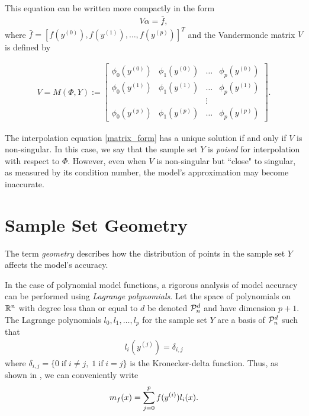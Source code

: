 This equation can be written more compactly in the form
\begin{align}
\label{matrix_form}
V \alpha = \bar{f},
\end{align}
where $\bar{f} = [f(y^{(0)}), f(y^{(1)}), \ldots, f(y^{(p)})]^T$ and the Vandermonde matrix $V$ is defined by 

\begin{align}
\label{vandermonde}
V=M(\Phi,Y) :=
\begin{bmatrix}
    \phi_0(y^{(0)})      & \phi_1(y^{(0)})       & \ldots & \phi_{p}(y^{(0)})      \\
    \phi_0(y^{(1)})      & \phi_1(y^{(1)})       & \dots  & \phi_{p}(y^{(1)})      \\
                     &                   & \vdots &                    \\
    \phi_0(y^{(p)})    & \phi_1(y^{(p)})     & \ldots & \phi_{p}(y^{{(p)}})
\end{bmatrix}.
\end{align}


The interpolation equation \cref{matrix_form} has a unique solution if and only if $V$ is non-singular.
In this case, we say that the sample set $Y$ is \emph{poised} for interpolation with respect to $\Phi$. 
However, even when $V$ is non-singular but ``close" to singular, as measured by its condition number, 
the model's approximation may become inaccurate.


\section{Sample Set Geometry}

\label{geometry}
The term \emph{geometry} describes how the distribution of points in the sample set $Y$ affects the model's accuracy.

In the case of polynomial model functions, a rigorous analysis of model accuracy can be performed using \emph{Lagrange polynomials}.
Let the space of polynomials on $\mathbb R^n$ with degree less than or equal to $d$ be denoted $\mathcal{P}^d_n$ and have dimension $p+1$.
The Lagrange polynomials $l_0, l_1, \ldots, l_p$ for the sample set $Y$ are a basis of $\mathcal{P}^d_n$ such that
\begin{align}
l_i(y^{(j)}) = \delta_{i,j}
\end{align}
where $\delta_{i,j} = \{0 \;\text{if}\; i\ne j,\; 1 \;\text{if} \; i = j \}$ is the Kronecker-delta function.
Thus, as shown in \cite{introduction_book}, we can conveniently write
\begin{align}
\label{reg}
{{m}_f}(x) = \sum^p_{j=0}f(y^{(i)})l_i(x).
\end{align}


